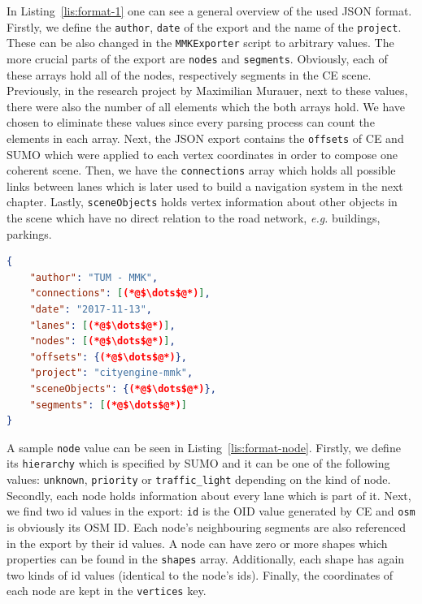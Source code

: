 In Listing~\ref{lis:format-1} one can see a general overview of the used JSON format. Firstly, we define the \texttt{author}, \texttt{date} of the export and the name of the \texttt{project}. These can be also changed in the \texttt{MMKExporter} script to arbitrary values. The more crucial parts of the export are \texttt{nodes} and \texttt{segments}. Obviously, each of these arrays hold all of the nodes, respectively segments in the CE scene. Previously, in the research project by Maximilian Murauer, next to these values, there were also the number of all elements which the both arrays hold. We have chosen to eliminate these values since every parsing process can count the elements in each array. Next, the JSON export contains the \texttt{offsets} of CE and SUMO which were applied to each vertex coordinates in order to compose one coherent scene. Then, we have the \texttt{connections} array which holds all possible links between lanes which is later used to build a navigation system in the next chapter. Lastly, \texttt{sceneObjects} holds vertex information about other objects in the scene which have no direct relation to the road network, \emph{e.g.} buildings, parkings.\\

    \begin{scriptsize}
	   \begin{lstlisting}[language=json,firstnumber=1,caption={General overview of the used JSON format for description of road networks.},label={lis:format-1}]
{
    "author": "TUM - MMK",
    "connections": [(*@$\dots$@*)],
    "date": "2017-11-13",
    "lanes": [(*@$\dots$@*)],
    "nodes": [(*@$\dots$@*)],
    "offsets": {(*@$\dots$@*)},
    "project": "cityengine-mmk",
    "sceneObjects": {(*@$\dots$@*)},
    "segments": [(*@$\dots$@*)]
}
	   \end{lstlisting}
    \end{scriptsize}

A sample \texttt{node} value can be seen in Listing~\ref{lis:format-node}. Firstly, we define its \texttt{hierarchy} which is specified by SUMO and it can be one of the following values: \texttt{unknown}, \texttt{priority} or \texttt{traffic\_light} depending on the kind of node. Secondly, each node holds information about every lane which is part of it. Next, we find two id values in the export: \texttt{id} is the OID value generated by CE and \texttt{osm} is obviously its OSM ID. Each node's neighbouring segments are also referenced in the export by their id values. A node can have zero or more shapes which properties can be found in the \texttt{shapes} array. Additionally, each shape has again two kinds of id values (identical to the node's ids). Finally, the coordinates of each node are kept in the \texttt{vertices} key.\\\\\\
 	
